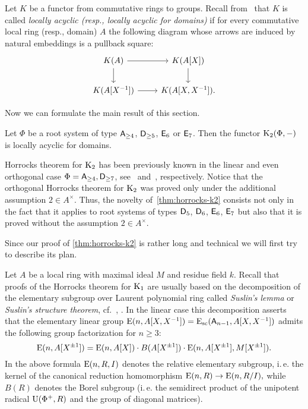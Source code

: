 \begin{dfn}
    Let $K$ be a functor from commutative rings to groups.
    Recall from~\cite{LSV2} that $K$ is called \textit{locally acyclic (resp., locally acyclic for domains)} if for every commutative local ring (resp., domain)
     $A$ the following diagram whose arrows are induced by natural embeddings is a pullback square:
    \begin{equation}\label{eq:P1-square} \begin{tikzcd} K(A) \ar[r] \ar[d] & K(A[X]) \arrow{d} \\ K(A[X\inv]) \ar{r} & K(A[X, X\inv]). \end{tikzcd} \end{equation}
\end{dfn}

Now we can formulate the main result of this section.
\begin{thm}\label{thm:horrocks-k2}
Let $\Phi$ be a root system of type $\mathsf{A}_{\geq 4}$, $\mathsf{D}_{\geq 5}$, $\mathsf{E}_6$ or $\mathsf{E}_7$.
Then the functor $\operatorname{K}_{2}(\Phi, -)$ is locally acyclic for domains.
\end{thm}
Horrocks theorem for $\operatorname{K}_2$ has been previously known in the linear and even orthogonal case $\Phi=\mathsf{A}_{\geq 4},\mathsf{D}_{\geq 7}$, see~\cite[Proposition~4.3]{Tu83} and~\cite[Theorem~1]{LS20}, respectively.
Notice that the orthogonal Horrocks theorem for $\operatorname{K}_2$ \cite[Theorem~1]{LS20} was proved only under the additional assumption $2 \in A^\times$.
Thus, the novelty of~\cref{thm:horrocks-k2} consists not only in the fact that it applies to root systems of types $\mathsf{D}_5$, $\mathsf{D}_6$, $\mathsf{E}_6$, $\mathsf{E}_7$ but also that
 it is proved without the assumption $2 \in A^\times$.

Since our proof of \cref{thm:horrocks-k2} is rather long and technical we will first try to describe its plan.

Let $A$ be a local ring with maximal ideal $M$ and residue field $k$.
Recall that proofs of the Horrocks theorem for $\operatorname{K}_1$ are usually based on the decomposition of the elementary subgroup over Laurent polynomial ring
 called \textit{Suslin's lemma} or \textit{Suslin's structure theorem}, cf.~\cite{Abe83, Su77}, \cite[\S~VI.6]{Lam10}.
In the linear case this decomposition asserts that the elementary linear group $\operatorname{E}(n, A[X, X^{-1}]) = \operatorname{E}_\mathrm{sc}(\mathsf{A}_{n-1}, A[X, X^{-1}])$ admits the following group factorization for $n \geq 3$:
\begin{equation}\label{eq:triple-decomposition}
\operatorname{E}(n, A[X^{\pm 1}]) = \operatorname{E}(n, A[X]) \cdot B(A[X^{\pm 1}]) \cdot \operatorname{E}(n, A[X^{\pm 1}], M[X^{\pm 1}]).
\end{equation}
In the above formula $\operatorname{E}(n, R, I)$ denotes the relative elementary subgroup, i.\,e. the kernel of the canonical reduction homomorphism $\operatorname{E}(n, R) \to \operatorname{E}(n, R/I),$
 while $B(R)$ denotes the Borel subgroup (i.\,e. the semidirect product of the unipotent radical $\operatorname{U}(\Phi^+, R)$ and the group of diagonal matrices).

